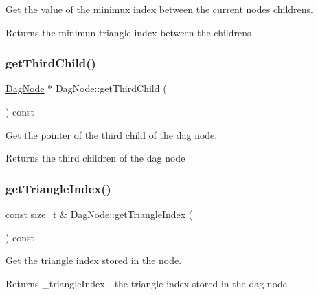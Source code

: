 Get the value of the minimux index between the current node\textquotesingle{}s childrens. 

\begin{DoxyReturn}{Returns}
the minimun triangle index between the childrens 
\end{DoxyReturn}
\mbox{\label{classDagNode_a6a7af1fc33b66e3a22ebcf1b7da4f482}} 
\subsubsection{\texorpdfstring{get\+Third\+Child()}{getThirdChild()}}
{\footnotesize\ttfamily \hyperlink{classDagNode}{Dag\+Node} $\ast$ Dag\+Node\+::get\+Third\+Child (\begin{DoxyParamCaption}{ }\end{DoxyParamCaption}) const\hspace{0.3cm}{\ttfamily [inline]}}



Get the pointer of the third child of the dag node. 

\begin{DoxyReturn}{Returns}
the third children of the dag node 
\end{DoxyReturn}
\mbox{\label{classDagNode_a5ff9ecbb6e1a5008c5b833afc8f08bab}} 
\subsubsection{\texorpdfstring{get\+Triangle\+Index()}{getTriangleIndex()}}
{\footnotesize\ttfamily const size\+\_\+t \& Dag\+Node\+::get\+Triangle\+Index (\begin{DoxyParamCaption}{ }\end{DoxyParamCaption}) const\hspace{0.3cm}{\ttfamily [inline]}}



Get the triangle index stored in the node. 

\begin{DoxyReturn}{Returns}
\+\_\+triangle\+Index -\/ the triangle index stored in the dag node 
\end{DoxyReturn}
\mbox{\label{classDagNode_af3ed3a5eed4cb9bf04ec6ad9b6877cce}} 

